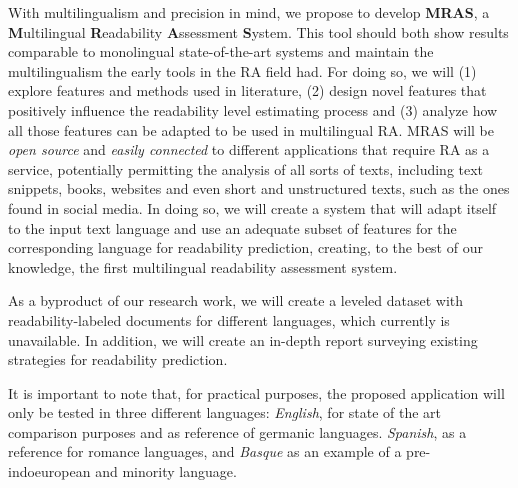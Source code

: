 \documentclass[12pt]{article}
\begin{document}
With multilingualism and precision in mind, we propose to develop \textbf{MRAS}, a \textbf{M}ultilingual \textbf{R}eadability \textbf{A}ssessment \textbf{S}ystem. This tool should both show results comparable to monolingual state-of-the-art systems  and  maintain the multilingualism the early tools in the RA field had. For doing so, we will (1) explore features and methods used in literature, (2) design novel features that positively influence the readability level estimating process and (3) analyze how all those features can be adapted to be used in multilingual RA.
MRAS will be \textit{open source} and \textit{easily connected} to different applications that require RA as a service, potentially permitting the analysis of all sorts of texts, including text snippets, books, websites and even short and unstructured texts, such as the ones found in social media. In doing so, we will create a system that will adapt itself to the input text language and use an adequate subset of features for the corresponding language for readability prediction, creating, to the best of our knowledge, the first multilingual readability assessment system.

As a byproduct of our research work, we will create a leveled dataset with readability-labeled documents for different languages, which currently is unavailable. In addition, we will create an in-depth report surveying existing strategies for readability prediction.

It is important to note that, for practical purposes, the proposed application will only be tested in three different languages: \textit{English}, for state of the art comparison purposes and as reference of germanic languages. \textit{Spanish}, as a reference for romance languages, and \textit{Basque} as an example of a pre-indoeuropean and minority language.
\end{document}

